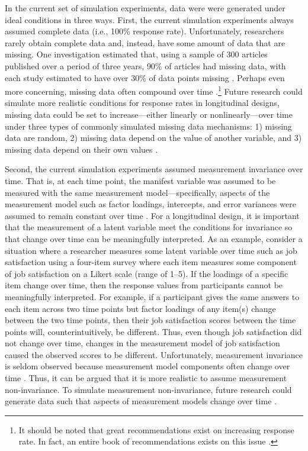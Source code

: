 \documentclass[
12pt, %
twoside,
english]{guelphthesis}
\begin{document}
In the current set of simulation experiments, data were were generated under ideal conditions in three ways. First, the current simulation experiments always assumed complete data (i.e., 100\% response rate). Unfortunately, researchers rarely obtain complete data and, instead, have some amount of data that are missing. One investigation estimated that, using a sample of 300 articles published over a period of three years, 90\% of articles had missing data, with each study estimated to have over 30\% of data points missing \autocite[Chapter 1]{mcknight2007}. Perhaps even more concerning, missing data often compound over time \autocite{newman2003}.\footnote{It should be noted that great recommendations exist on increasing response rate. In fact, an entire book of recommendations exists on this issue \parencite[see][]{dillman2014}.} Future research could simulate more realistic conditions for response rates in longitudinal designs, missing data could be set to increase---either linearly or nonlinearly---over time under three types of commonly simulated missing data mechanisms: 1) missing data are random, 2) missing data depend on the value of another variable, and 3) missing data depend on their own values \autocite{newman2009}.

Second, the current simulation experiments assumed measurement invariance over time. That is, at each time point, the manifest variable was assumed to be measured with the same measurement model---specifically, aspects of the measurement model such as factor loadings, intercepts, and error variances were assumed to remain constant over time \autocite{mellenbergh1989,vandenberg2000}. For a longitudinal design, it is important that the measurement of a latent variable meet the conditions for invariance so that change over time can be meaningfully interpreted. As an example, consider a situation where a researcher measures some latent variable over time such as job satisfaction using a four-item survey where each item measures some component of job satisfaction on a Likert scale (range of 1--5). If the loadings of a specific item change over time, then the response values from participants cannot be meaningfully interpreted. For example, if a participant gives the same answers to each item across two time points but factor loadings of any item(s) change between the two time points, then their job satisfaction scores between the time points will, counterintuitively, be different. Thus, even though job satisfaction did not change over time, changes in the measurement model of job satisfaction caused the observed scores to be different. Unfortunately, measurement invariance is seldom observed \autocite{vandenberg2000,vandeschoot2015} because measurement model components often change over time \autocite[e.g.,][]{fried2016}. Thus, it can be argued that it is more realistic to assume measurement non-invariance. To simulate measurement non-invariance, future research could generate data such that aspects of measurement models change over time \autocite[e.g.,][]{kim2014a}.
\end{document}
